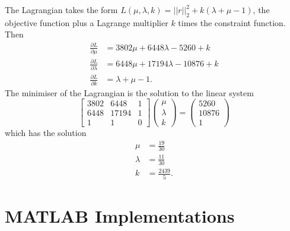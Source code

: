 The Lagrangian takes the form $L(\mu, \lambda, k) = ||r||_2^2 + k (\lambda + \mu - 1)$, the objective function plus a Lagrange multiplier $k$ times the constraint function.
Then
\begin{align*}
    \frac{\partial L}{\partial \mu} &= 3802 \mu + 6448 \lambda - 5260 + k \\
    \frac{\partial L}{\partial \lambda} &= 6448 \mu + 17194 \lambda - 10876 + k \\
    \frac{\partial L}{\partial k} &= \lambda + \mu - 1.
\end{align*}
The minimiser of the Lagrangian is the solution to the linear system
\begin{equation*}
    \begin{bmatrix}
        3802 & 6448 & 1 \\
        6448 & 17194 & 1 \\
        1 & 1 & 0
    \end{bmatrix} \begin{pmatrix}
        \mu \\
        \lambda \\
        k
    \end{pmatrix} = \begin{pmatrix}
        5260 \\
        10876 \\
        1
    \end{pmatrix}
\end{equation*}
which has the solution
\begin{align*}
    \mu &= \frac{19}{30} \\
    \lambda &= \frac{11}{30} \\
    k &= \frac{2439}{5}.
\end{align*}


\section{MATLAB Implementations}